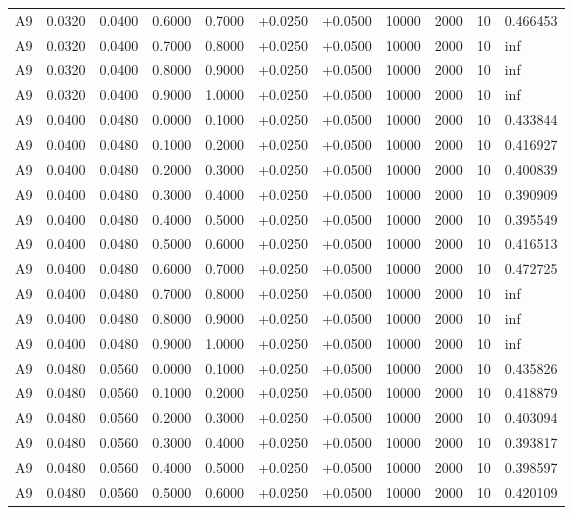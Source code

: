 \documentclass{article}
\begin{document}
\begin{longtable}{l r r r r r r r r r l}
A9 & 0.0320 & 0.0400 & 0.6000 & 0.7000 & +0.0250 & +0.0500 & 10000 & 2000 & 10 & 0.466453 \\
A9 & 0.0320 & 0.0400 & 0.7000 & 0.8000 & +0.0250 & +0.0500 & 10000 & 2000 & 10 & inf \\
A9 & 0.0320 & 0.0400 & 0.8000 & 0.9000 & +0.0250 & +0.0500 & 10000 & 2000 & 10 & inf \\
A9 & 0.0320 & 0.0400 & 0.9000 & 1.0000 & +0.0250 & +0.0500 & 10000 & 2000 & 10 & inf \\
A9 & 0.0400 & 0.0480 & 0.0000 & 0.1000 & +0.0250 & +0.0500 & 10000 & 2000 & 10 & 0.433844 \\
A9 & 0.0400 & 0.0480 & 0.1000 & 0.2000 & +0.0250 & +0.0500 & 10000 & 2000 & 10 & 0.416927 \\
A9 & 0.0400 & 0.0480 & 0.2000 & 0.3000 & +0.0250 & +0.0500 & 10000 & 2000 & 10 & 0.400839 \\
A9 & 0.0400 & 0.0480 & 0.3000 & 0.4000 & +0.0250 & +0.0500 & 10000 & 2000 & 10 & 0.390909 \\
A9 & 0.0400 & 0.0480 & 0.4000 & 0.5000 & +0.0250 & +0.0500 & 10000 & 2000 & 10 & 0.395549 \\
A9 & 0.0400 & 0.0480 & 0.5000 & 0.6000 & +0.0250 & +0.0500 & 10000 & 2000 & 10 & 0.416513 \\
A9 & 0.0400 & 0.0480 & 0.6000 & 0.7000 & +0.0250 & +0.0500 & 10000 & 2000 & 10 & 0.472725 \\
A9 & 0.0400 & 0.0480 & 0.7000 & 0.8000 & +0.0250 & +0.0500 & 10000 & 2000 & 10 & inf \\
A9 & 0.0400 & 0.0480 & 0.8000 & 0.9000 & +0.0250 & +0.0500 & 10000 & 2000 & 10 & inf \\
A9 & 0.0400 & 0.0480 & 0.9000 & 1.0000 & +0.0250 & +0.0500 & 10000 & 2000 & 10 & inf \\
A9 & 0.0480 & 0.0560 & 0.0000 & 0.1000 & +0.0250 & +0.0500 & 10000 & 2000 & 10 & 0.435826 \\
A9 & 0.0480 & 0.0560 & 0.1000 & 0.2000 & +0.0250 & +0.0500 & 10000 & 2000 & 10 & 0.418879 \\
A9 & 0.0480 & 0.0560 & 0.2000 & 0.3000 & +0.0250 & +0.0500 & 10000 & 2000 & 10 & 0.403094 \\
A9 & 0.0480 & 0.0560 & 0.3000 & 0.4000 & +0.0250 & +0.0500 & 10000 & 2000 & 10 & 0.393817 \\
A9 & 0.0480 & 0.0560 & 0.4000 & 0.5000 & +0.0250 & +0.0500 & 10000 & 2000 & 10 & 0.398597 \\
A9 & 0.0480 & 0.0560 & 0.5000 & 0.6000 & +0.0250 & +0.0500 & 10000 & 2000 & 10 & 0.420109 \\

\end{longtable}
\end{document}
